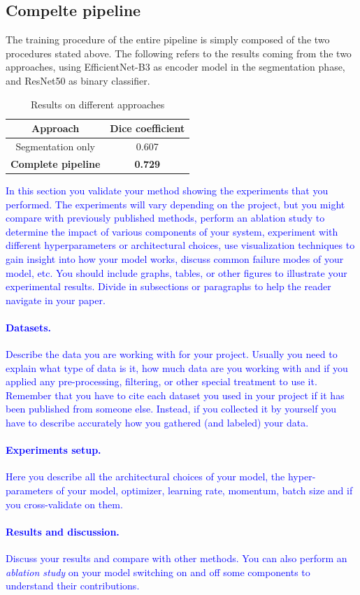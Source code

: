 \documentclass[10pt,twocolumn,letterpaper]{article}
\begin{document}
   \subsection{Compelte pipeline}
      The training procedure of the entire pipeline is simply composed of the two procedures stated above.
      The following refers to the results coming from the two approaches, using EfficientNet-B3 as encoder model in the segmentation phase, and ResNet50 as binary classifier. 
      \begin{table}[h]
         \centering
         \begin{tabular}{||c c||} 
         \hline
         Approach & Dice coefficient\\ [0.5ex] 
         \hline\hline
         Segmentation only & 0.607 \\ 
         \hline
         \textbf{Complete pipeline} & \textbf{0.729} \\
         \hline
         \end{tabular}
         \caption{Results on different approaches}
         \label{table:res_finals}
      \end{table}


\textcolor{blue}{
In this section you validate your method showing the experiments that you performed. The experiments will vary depending on the project, but you might compare with previously published methods, perform an ablation study to determine the impact of various components of your system, experiment with different hyperparameters or architectural choices, use visualization techniques to gain insight into how your model works, discuss common failure modes of your model, etc. You should include graphs, tables, or other figures to illustrate your experimental results. Divide in subsections or paragraphs to help the reader navigate in your paper.
\paragraph{Datasets.}
Describe the data you are working with for your project. Usually you need to explain what type of data is it, how much data are you working with and if you applied any pre-processing, filtering, or other special treatment to use it. Remember that you have to cite each dataset you used in your project if it has been published from someone else. Instead, if you collected it by yourself you have to describe accurately how you gathered (and labeled) your data. 
\paragraph{Experiments setup.}
Here you describe all the architectural choices of your model, the hyper-parameters of your model, \eg optimizer, learning rate, momentum, batch size and if you cross-validate on them. 
\paragraph{Results and discussion.}
Discuss your results and compare with other methods. You can also perform an \emph{ablation study} on your model switching on and off some components to understand their contributions.
}
\end{document}
